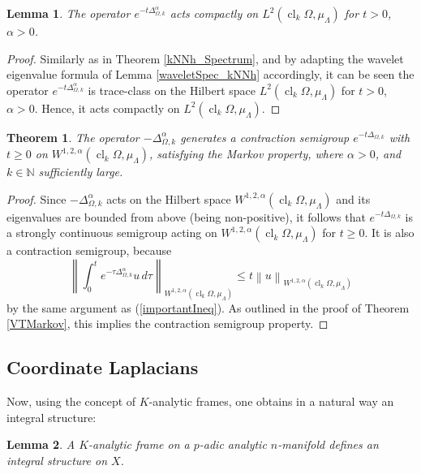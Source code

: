 \documentclass[a4paper,draft]{ZbRad}
\theoremstyle{plain}
\newtheorem{thm}{Theorem}[section]
\newtheorem{lem}{Lemma}[section]
\theoremstyle{definition}
\numberwithin{equation}{section}
\renewcommand{\le}{\leqslant}\renewcommand{\leq}{\leqslant}
\renewcommand{\ge}{\geqslant}\renewcommand{\geq}{\geqslant}
\newcommand{\norm}[1]{\left\|#1\right\|}
\DeclareMathOperator{\closure}{cl}
\begin{document}
\begin{lem}
The operator $e^{-t\Delta^\alpha_{\Omega,k}}$ acts compactly on $L^2(\closure_k\Omega,\mu_\Lambda)$ for $t > 0$, $\alpha>0$.
\end{lem}

\begin{proof}
Similarly as in Theorem \ref{kNNh_Spectrum}, and by adapting the wavelet eigenvalue formula of Lemma \ref{waveletSpec_kNNh} accordingly, 
it can be seen the operator 
$e^{-t\Delta_{\Omega,k}^\alpha}$ is trace-class on the Hilbert space $L^2(\closure_k\Omega,\mu_\Lambda)$ for $t > 0$,
$\alpha > 0$. Hence, it acts compactly on $L^2(\closure_k\Omega,\mu_\Lambda)$.
\end{proof}

\begin{thm}
The operator $-\Delta^\alpha_{\Omega,k}$ generates a contraction semigroup $e^{-t\Delta_{\Omega,k}}$ with $t\ge0$ on $W^{1,2,\alpha}(\closure_k\Omega,\mu_\Lambda)$, satisfying the Markov property, where $\alpha > 0$, and $k\in\mathbb{N}$ sufficiently large.
\end{thm}

\begin{proof}
Since $-\Delta^{\alpha}_{\Omega,k}$ acts on the Hilbert space $W^{1,2,\alpha}(\closure_k\Omega,\mu_\Lambda)$ and its eigenvalues are bounded from above (being non-positive), it follows that $e^{-t\Delta_{\Omega,k}}$
is a strongly continuous semigroup acting on $W^{1,2,\alpha}(\closure_k\Omega,\mu_\Lambda)$ for $t\ge 0$. It
is also a contraction semigroup, because 
\[
\norm{\int_0^t e^{-\tau\Delta^\alpha_{\Omega,k}}u\,d\tau}_{W^{1,2,\alpha}(\closure_k\Omega,\mu_\Lambda)}
\le t\norm{u}_{W^{1,2,\alpha}(\closure_k\Omega,\mu_\Lambda)}
\]
by the same argument as (\ref{importantIneq}). As outlined in the proof of Theorem \ref{VTMarkov}, this
implies the contraction semigroup property.
\end{proof}

\subsection{Coordinate Laplacians}


Now, using the concept of $K$-analytic frames, one obtains in a natural way an integral structure:

\begin{lem}
A $K$-analytic frame on  a $p$-adic analytic $n$-manifold defines an integral structure on $X$.
\end{lem}
\end{document}
